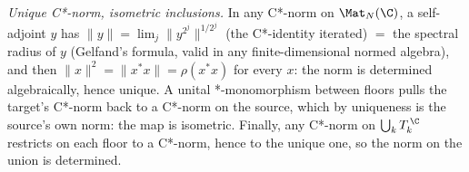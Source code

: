 \emph{Unique C*-norm, isometric inclusions.} In any C*-norm on $\Mat_N(\C)$, a self-adjoint $y$ has $\|y\| = \lim_j \|y^{2^j}\|^{1/2^j}$ (the C*-identity iterated) $=$ the spectral radius of $y$ (Gelfand's formula, valid in any finite-dimensional normed algebra), and then $\|x\|^2 = \|x^*x\| = \rho(x^* x)$ for every $x$: the norm is determined algebraically, hence unique. A unital *-monomorphism between floors pulls the target's C*-norm back to a C*-norm on the source, which by uniqueness is the source's own norm: the map is isometric. Finally, any C*-norm on $\bigcup_k T_k^{\,\C}$ restricts on each floor to a C*-norm, hence to the unique one, so the norm on the union is determined.
